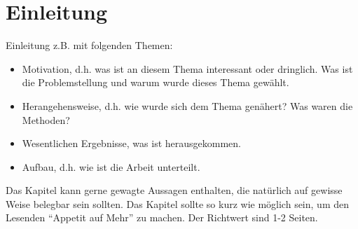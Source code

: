 \chapter{Einleitung}
\label{chap:intro}

Einleitung z.B. mit folgenden Themen:
\begin{itemize}
	\item Motivation, d.h. was ist an diesem Thema interessant oder dringlich. Was ist die Problemstellung und warum wurde dieses Thema gewählt.
	\item Herangehensweise, d.h. wie wurde sich dem Thema genähert? Was waren die Methoden?
	\item Wesentlichen Ergebnisse, was ist herausgekommen.
	\item Aufbau, d.h. wie ist die Arbeit unterteilt. 
\end{itemize}

Das Kapitel kann gerne gewagte Aussagen enthalten, die natürlich auf gewisse Weise belegbar sein sollten. Das Kapitel sollte so kurz wie möglich sein, um den Lesenden "`Appetit auf Mehr"' zu machen. Der Richtwert sind 1-2 Seiten. 